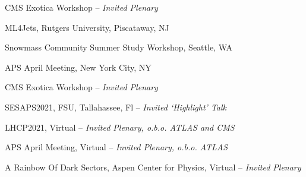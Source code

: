 \documentclass[11pt,letterpaper]{article}
\begin{document}
\begin{itemizetighter}
  \item CMS Exotica Workshop -- \emph{Invited Plenary}  %

  \item ML4Jets, Rutgers University, Piscataway, NJ  %

  \item Snowmass Community Summer Study Workshop, Seattle, WA  %

  \item APS April Meeting, New York City, NY  %

  \item CMS Exotica Workshop -- \emph{Invited Plenary}  %

  \item SESAPS2021, FSU, Tallahassee, Fl -- \emph{Invited `Highlight' Talk} %



  \item LHCP2021, Virtual -- \emph{Invited Plenary, o.b.o. ATLAS and CMS}

  \item APS April Meeting, Virtual -- \emph{Invited Plenary, o.b.o. ATLAS}

  \item A Rainbow Of Dark Sectors, Aspen Center for Physics, Virtual -- \emph{Invited Plenary}



\end{itemizetighter}
\end{document}
